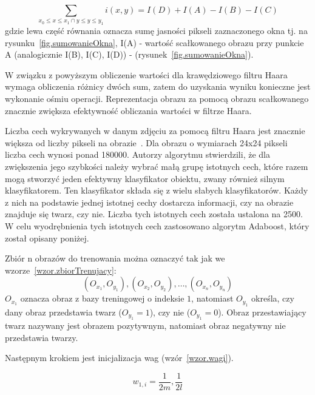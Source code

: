 \documentclass[a4paper,twoside,12pt]{book}
\begin{document}
    \large
    \begin{equation}
        \sum_{x_0\leq x \leq x_1\cap {y}\leq y \leq y_1}^{} i(x,y) = I(D) + I(A) - I(B) - I(C)
        \label{wzor.windowsSum}
    \end{equation}
    \normalsize
    gdzie lewa część równania oznacza sumę jasności pikseli
    zaznaczonego okna tj.
    na rysunku~\ref{fig.sumowanieOkna}, I(A) - wartość scałkowanego obrazu przy punkcie A
    (analogicznie I(B), I(C), I(D)) - (rysunek~\ref{fig.sumowanieOkna}).

    W związku z powyższym obliczenie wartości dla krawędziowego filtru Haara wymaga obliczenia różnicy dwóch sum,
    zatem do uzyskania wyniku konieczne jest wykonanie ośmiu operacji.
    Reprezentacja obrazu za pomocą obrazu scałkowanego znacznie zwiększa efektywność obliczania wartości w filtrze
    Haara.

    Liczba cech wykrywanych w danym zdjęciu za
    pomocą filtru Haara jest znacznie większa od liczby pikseli na obrazie~\cite{violaJones}.
    Dla obrazu o wymiarach 24x24 pikseli liczba cech wynosi ponad 180000.
    Autorzy algorytmu stwierdzili, że dla zwiększenia jego szybkości należy wybrać małą grupę istotnych cech,
    które razem mogą stworzyć jeden efektywny klasyfikator obiektu, zwany również silnym klasyfikatorem. Ten
    klasyfikator składa się z wielu słabych klasyfikatorów. Każdy z nich na podstawie jednej istotnej cechy dostarcza
    informacji, czy na obrazie znajduje się twarz, czy nie. Liczba tych
    istotnych cech została ustalona na 2500.
    W celu wyodrębnienia tych istotnych cech zastosowano algorytm Adaboost, który został opisany poniżej.

    Zbiór n obrazów do trenowania można oznaczyć tak jak we wzorze~\ref{wzor.zbiorTrenujacy}:
    \large
    \begin{equation}
        (O_{x_1}, O_{y_1}), (O_{x_2}, O_{y_2}), \ldots, (O_{x_n}, O_{y_n})
        \label{wzor.zbiorTrenujacy}
    \end{equation}
    \normalsize
    $O_{x_1}$ oznacza obraz z bazy treningowej o indeksie $1$, natomiast $O_{y_1}$ określa, czy dany obraz
    przedstawia twarz ($O_{y_1} = 1$), czy nie ($O_{y_1} = 0$). Obraz przestawiający twarz nazywany jest obrazem
    pozytywnym, natomiast obraz negatywny nie przedstawia twarzy.

    Następnym krokiem jest inicjalizacja wag (wzór~\ref{wzor.wagi}).

    \large
    \begin{equation}
        w_{1,i} = \frac{1}{2m}, \frac{1}{2l}
        \label{wzor.wagi}
    \end{equation}
    \normalsize
\end{document}

